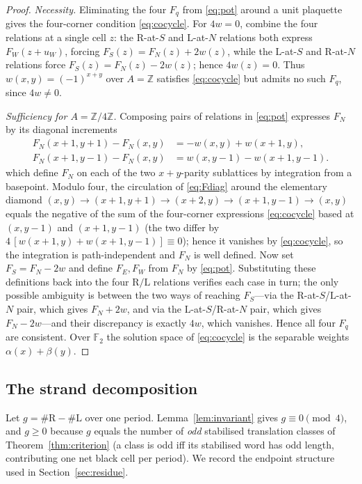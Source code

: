 \documentclass[11pt,reqno]{amsart}
\theoremstyle{plain}
\theoremstyle{definition}
\newcommand{\Z}{\mathbb{Z}}
\newcommand{\F}{\mathbb{F}}
\newcommand{\growth}{g}
\newcommand{\turnR}{\mathrm{R}}
\newcommand{\turnL}{\mathrm{L}}
\begin{document}
\begin{proof}
\emph{Necessity.} Eliminating the four $F_q$ from \eqref{eq:pot} around a unit
plaquette gives the four-corner condition \eqref{eq:cocycle}. For $4w=0$, combine the
four relations at a single cell $z$: the $\turnR$-at-$S$ and $\turnL$-at-$N$ relations
both express $F_W(z+u_W)$, forcing $F_S(z)=F_N(z)+2w(z)$, while the $\turnL$-at-$S$ and
$\turnR$-at-$N$ relations force $F_S(z)=F_N(z)-2w(z)$; hence $4w(z)=0$. Thus
$w(x,y)=(-1)^{x+y}$ over $A=\Z$ satisfies \eqref{eq:cocycle} but admits no such $F_q$,
since $4w\neq0$.

\emph{Sufficiency for $A=\Z/4\Z$.} Composing pairs of relations in \eqref{eq:pot}
expresses $F_N$ by its diagonal increments
\begin{equation}\label{eq:Fdiag}
\begin{aligned}
F_N(x{+}1,y{+}1)-F_N(x,y)&=-w(x,y)+w(x{+}1,y),\\
F_N(x{+}1,y{-}1)-F_N(x,y)&=w(x,y{-}1)-w(x{+}1,y{-}1).
\end{aligned}
\end{equation}
which define $F_N$ on each of the two $x{+}y$-parity sublattices by integration from a
basepoint. Modulo four, the circulation of \eqref{eq:Fdiag} around the elementary
diamond $(x,y)\to(x{+}1,y{+}1)\to(x{+}2,y)\to(x{+}1,y{-}1)\to(x,y)$ equals the negative
of the sum of the four-corner expressions \eqref{eq:cocycle} based at $(x,y{-}1)$ and
$(x{+}1,y{-}1)$ (the two differ by $4\,[w(x{+}1,y)+w(x{+}1,y{-}1)]\equiv0$); hence it
vanishes by \eqref{eq:cocycle}, so the integration is path-independent and $F_N$ is
well defined. Now set $F_S=F_N-2w$ and define $F_E,F_W$ from $F_N$ by \eqref{eq:pot}.
Substituting these definitions back into the four $\turnR/\turnL$ relations verifies
each case in turn; the only possible ambiguity is between the two ways of reaching
$F_S$---via the $\turnR$-at-$S$/$\turnL$-at-$N$ pair, which gives $F_N+2w$, and via the
$\turnL$-at-$S$/$\turnR$-at-$N$ pair, which gives $F_N-2w$---and their discrepancy is
exactly $4w$, which vanishes. Hence all four $F_q$ are consistent. Over $\F_2$ the
solution space of \eqref{eq:cocycle} is the separable weights $\alpha(x)+\beta(y)$.
\end{proof}

\subsection{The strand decomposition}
Let $\growth=\#\turnR-\#\turnL$ over one period. Lemma~\ref{lem:invariant} gives
$\growth\equiv0\pmod4$, and $\growth\ge0$ because $\growth$ equals the number of
\emph{odd} stabilised translation classes of Theorem~\ref{thm:criterion} (a class is
odd iff its stabilised word has odd length, contributing one net black cell per
period). We record the endpoint structure used in Section~\ref{sec:residue}.
\end{document}
